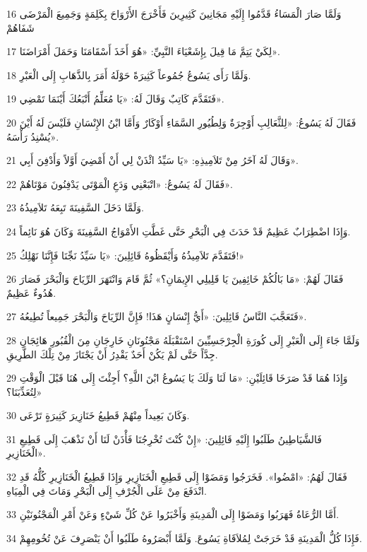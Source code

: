 \par 16 وَلَمَّا صَارَ الْمَسَاءُ قَدَّمُوا إِلَيْهِ مَجَانِينَ كَثِيرِينَ فَأَخْرَجَ الأَرْوَاحَ بِكَلِمَةٍ وَجَمِيعَ الْمَرْضَى شَفَاهُمْ
\par 17 لِكَيْ يَتِمَّ مَا قِيلَ بِإِشَعْيَاءَ النَّبِيِّ: «هُوَ أَخَذَ أَسْقَامَنَا وَحَمَلَ أَمْرَاضَنَا».
\par 18 وَلَمَّا رَأَى يَسُوعُ جُمُوعاً كَثِيرَةً حَوْلَهُ أَمَرَ بِالذَّهَابِ إِلَى الْعَبْرِ.
\par 19 فَتَقَدَّمَ كَاتِبٌ وَقَالَ لَهُ: «يَا مُعَلِّمُ أَتْبَعُكَ أَيْنَمَا تَمْضِي».
\par 20 فَقَالَ لَهُ يَسُوعُ: «لِلثَّعَالِبِ أَوْجِرَةٌ وَلِطُيُورِ السَّمَاءِ أَوْكَارٌ وَأَمَّا ابْنُ الإِنْسَانِ فَلَيْسَ لَهُ أَيْنَ يُسْنِدُ رَأْسَهُ».
\par 21 وَقَالَ لَهُ آخَرُ مِنْ تَلاَمِيذِهِ: «يَا سَيِّدُ ائْذَنْ لِي أَنْ أَمْضِيَ أَوَّلاً وَأَدْفِنَ أَبِي».
\par 22 فَقَالَ لَهُ يَسُوعُ: «اتْبَعْنِي وَدَعِ الْمَوْتَى يَدْفِنُونَ مَوْتَاهُمْ».
\par 23 وَلَمَّا دَخَلَ السَّفِينَةَ تَبِعَهُ تَلاَمِيذُهُ.
\par 24 وَإِذَا اضْطِرَابٌ عَظِيمٌ قَدْ حَدَثَ فِي الْبَحْرِ حَتَّى غَطَّتِ الأَمْوَاجُ السَّفِينَةَ وَكَانَ هُوَ نَائِماً.
\par 25 فَتَقَدَّمَ تَلاَمِيذُهُ وَأَيْقَظُوهُ قَائِلِينَ: «يَا سَيِّدُ نَجِّنَا فَإِنَّنَا نَهْلِكُ!»
\par 26 فَقَالَ لَهُمْ: «مَا بَالُكُمْ خَائِفِينَ يَا قَلِيلِي الإِيمَانِ؟» ثُمَّ قَامَ وَانْتَهَرَ الرِّيَاحَ وَالْبَحْرَ فَصَارَ هُدُوءٌ عَظِيمٌ.
\par 27 فَتَعَجَّبَ النَّاسُ قَائِلِينَ: «أَيُّ إِنْسَانٍ هَذَا! فَإِنَّ الرِّيَاحَ وَالْبَحْرَ جَمِيعاً تُطِيعُهُ».
\par 28 وَلَمَّا جَاءَ إِلَى الْعَبْرِ إِلَى كُورَةِ الْجِرْجَسِيِّينَ اسْتَقْبَلَهُ مَجْنُونَانِ خَارِجَانِ مِنَ الْقُبُورِ هَائِجَانِ جِدَّاً حَتَّى لَمْ يَكُنْ أَحَدٌ يَقْدِرُ أَنْ يَجْتَازَ مِنْ تِلْكَ الطَّرِيقِ.
\par 29 وَإِذَا هُمَا قَدْ صَرَخَا قَائِلَيْنِ: «مَا لَنَا وَلَكَ يَا يَسُوعُ ابْنَ اللَّهِ؟ أَجِئْتَ إِلَى هُنَا قَبْلَ الْوَقْتِ لِتُعَذِّبَنَا؟»
\par 30 وَكَانَ بَعِيداً مِنْهُمْ قَطِيعُ خَنَازِيرَ كَثِيرَةٍ تَرْعَى.
\par 31 فَالشَّيَاطِينُ طَلَبُوا إِلَيْهِ قَائِلِينَ: «إِنْ كُنْتَ تُخْرِجُنَا فَأْذَنْ لَنَا أَنْ نَذْهَبَ إِلَى قَطِيعِ الْخَنَازِيرِ».
\par 32 فَقَالَ لَهُمُ: «امْضُوا». فَخَرَجُوا وَمَضَوْا إِلَى قَطِيعِ الْخَنَازِيرِ وَإِذَا قَطِيعُ الْخَنَازِيرِ كُلُّهُ قَدِ انْدَفَعَ مِنْ عَلَى الْجُرْفِ إِلَى الْبَحْرِ وَمَاتَ فِي الْمِيَاهِ.
\par 33 أَمَّا الرُّعَاةُ فَهَرَبُوا وَمَضَوْا إِلَى الْمَدِينَةِ وَأَخْبَرُوا عَنْ كُلِّ شَيْءٍ وَعَنْ أَمْرِ الْمَجْنُونَيْنِ.
\par 34 فَإِذَا كُلُّ الْمَدِينَةِ قَدْ خَرَجَتْ لِمُلاَقَاةِ يَسُوعَ. وَلَمَّا أَبْصَرُوهُ طَلَبُوا أَنْ يَنْصَرِفَ عَنْ تُخُومِهِمْ.

